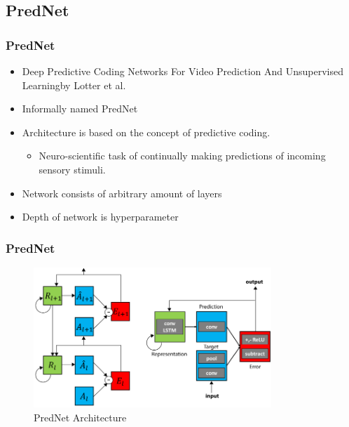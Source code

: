  \subsection{PredNet}
  \begin{frame}
   \frametitle{PredNet}
   
   \begin{itemize}
    \item<1-> \glqq Deep Predictive Coding Networks For Video Prediction And Unsupervised Learning\grqq by Lotter et al. \cite{Lotter2016}
    \item<2-> Informally named PredNet
    \item<3-> Architecture is based on the concept of \glqq predictive coding\grqq.
    \begin{itemize}
     \item<4-> Neuro-scientific task of \glqq continually making predictions of incoming sensory stimuli\grqq.
    \end{itemize}
    \item<5-> Network consists of arbitrary amount of layers
    \item<6-> Depth of network is hyperparameter
   \end{itemize}
   
  \end{frame}
  \begin{frame}
   \frametitle{PredNet}
   
   \begin{figure}[H]
    \includegraphics[width=0.8\textwidth]{../Images/lotter.png}
    \centering
    \caption{PredNet Architecture \citep{Lotter2016}}
    \label{fig:spatiotemp_architecture}
   \end{figure}
   
  \end{frame}
